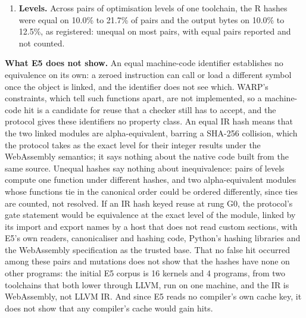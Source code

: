 \documentclass[10pt,letterpaper]{article}
\newcounter{none}
\begin{document}
\begin{enumerate}
  machine-code identifier of \texttt{run} in the WebAssembly objects was
  equal for the C and the Rust build of \texttt{fib} at five matching
  levels (1, 2, 3, s and z) and of \texttt{popcount} at s, 6 of 48
  pairs; each such pair computes one function, so it is not a false hit.
  On the linked modules the IR hashes differ in all 48 C and Rust pairs;
  the functions part of their canonical forms is equal in 6 of the 48,
  and the memory part in none.
\item
  \textbf{Levels.} Across pairs of optimisation levels of one toolchain,
  the R hashes were equal on 10.0\% to 21.7\% of pairs and the output
  bytes on 10.0\% to 12.5\%, as registered: unequal on most pairs, with
  equal pairs reported and not counted.
\end{enumerate}

\textbf{What E5 does not show.} An equal machine-code identifier
establishes no equivalence on its own: a zeroed instruction can call or
load a different symbol once the object is linked, and the identifier
does not see which. WARP's constraints, which tell such functions apart,
are not implemented, so a machine-code hit is a candidate for reuse that
a checker still has to accept, and the protocol gives these identifiers
no property class. An equal IR hash means that the two linked modules
are alpha-equivalent, barring a SHA-256 collision, which the protocol
takes as the exact level for their integer results under the WebAssembly
semantics; it says nothing about the native code built from the same
source. Unequal hashes say nothing about inequivalence: pairs of levels
compute one function under different hashes, and two alpha-equivalent
modules whose functions tie in the canonical order could be ordered
differently, since ties are counted, not resolved. If an IR hash keyed
reuse at rung G0, the protocol's gate statement would be equivalence at
the exact level of the module, linked by its import and export names by
a host that does not read custom sections, with E5's own readers,
canonicaliser and hashing code, Python's hashing libraries and the
WebAssembly specification as the trusted base. That no false hit
occurred among these pairs and mutations does not show that the hashes
have none on other programs: the initial E5 corpus is 16 kernels and 4
programs, from two toolchains that both lower through LLVM, run on one
machine, and the IR is WebAssembly, not LLVM IR. And since E5 reads no
compiler's own cache key, it does not show that any compiler's cache
would gain hits.
\end{document}
